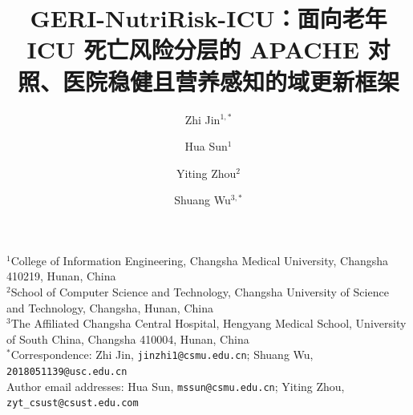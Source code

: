 \documentclass[11pt]{ctexart}
\title{GERI-NutriRisk-ICU：面向老年 ICU 死亡风险分层的 APACHE 对照、医院稳健且营养感知的域更新框架}
\author{Zhi Jin$^{1,*}$ \and Hua Sun$^{1}$ \and Yiting Zhou$^{2}$ \and Shuang Wu$^{3,*}$}
\date{}
\begin{document}
\maketitle

\begin{center}
\small
$^{1}$College of Information Engineering, Changsha Medical University, Changsha 410219, Hunan, China\\
$^{2}$School of Computer Science and Technology, Changsha University of Science and Technology, Changsha, Hunan, China\\
$^{3}$The Affiliated Changsha Central Hospital, Hengyang Medical School, University of South China, Changsha 410004, Hunan, China\\
$^{*}$Correspondence: Zhi Jin, \nolinkurl{jinzhi1@csmu.edu.cn}; Shuang Wu, \nolinkurl{2018051139@usc.edu.cn}\\
Author email addresses: Hua Sun, \nolinkurl{mssun@csmu.edu.cn}; Yiting Zhou, \nolinkurl{zyt_csust@csust.edu.com}
\end{center}
\end{document}
